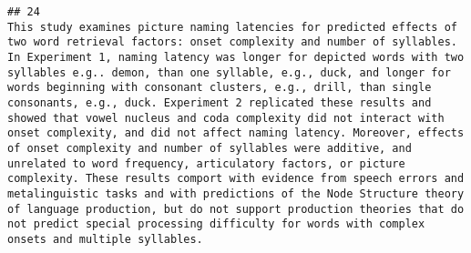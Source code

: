 \documentclass[
  english,
  man]{apa6}
\begin{document}
\begin{verbatim}
## 24                                                                                                                                                                                                                                                                                                                                                                                                                                                                                                                                                                                                                                                                                                                                                                                                                                                                                                                                                                                                                                                                                                                                                                                                                                                                                                                                                                                                                                                                                                                                                                                                                                                  This study examines picture naming latencies for predicted effects of two word retrieval factors: onset complexity and number of syllables. In Experiment 1, naming latency was longer for depicted words with two syllables e.g.. demon, than one syllable, e.g., duck, and longer for words beginning with consonant clusters, e.g., drill, than single consonants, e.g., duck. Experiment 2 replicated these results and showed that vowel nucleus and coda complexity did not interact with onset complexity, and did not affect naming latency. Moreover, effects of onset complexity and number of syllables were additive, and unrelated to word frequency, articulatory factors, or picture complexity. These results comport with evidence from speech errors and metalinguistic tasks and with predictions of the Node Structure theory of language production, but do not support production theories that do not predict special processing difficulty for words with complex onsets and multiple syllables.

\end{verbatim}
\end{document}
